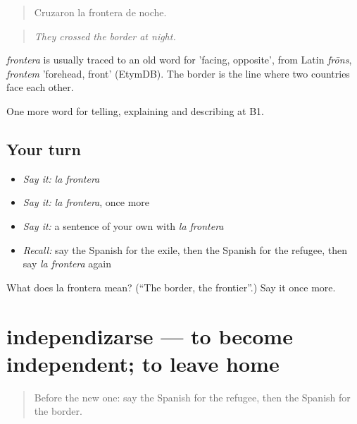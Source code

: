 \begin{quote}
Cruzaron la frontera de noche.
\end{quote}

\begin{quote}
\emph{They crossed the border at night.}
\end{quote}

\begin{cousinweb}
\emph{frontera} is usually traced to an old word for 'facing, opposite', from Latin \emph{frōns}, \emph{frontem} 'forehead, front' (EtymDB). The border is the line where two countries face each other.
\end{cousinweb}

\begin{grammarlens}[title={What you've built}]
One more word for telling, explaining and describing at B1.
\end{grammarlens}

\subsection*{Your turn}
\begin{itemize}
\raggedright
  \item \emph{Say it:} \emph{la frontera}
  \item \emph{Say it:} \emph{la frontera}, once more
  \item \emph{Say it:} a sentence of your own with \emph{la frontera}
  \item \emph{Recall:} say the Spanish for the exile, then the Spanish for the refugee, then say \emph{la frontera} again
\end{itemize}

\begin{tcolorbox}[breakable,colback=teal!4,colframe=teal!35!black,title={Before you move on}]
What does la frontera mean? (\textquotedblleft{}The border, the frontier\textquotedblright{}.) Say it once more.
\end{tcolorbox}
\section[independizarse]{independizarse — to become independent; to leave home}

\label{lesson:ES-C552-independizarse}



\begin{quote}
Before the new one: say the Spanish for the refugee, then the Spanish for the border.
\end{quote}

